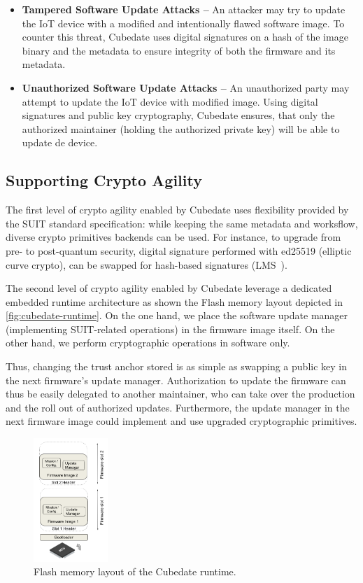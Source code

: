 \begin{itemize}
\item {\bf Tampered Software Update Attacks –} An attacker may try to update the IoT device with a modified and intentionally flawed software image. To counter this threat, Cubedate uses digital signatures on a hash of the image binary and the metadata to ensure integrity of both the firmware and its metadata.

\item {\bf Unauthorized Software Update Attacks –} An unauthorized party may attempt to update the IoT device with modified image. Using digital signatures and public key cryptography, Cubedate ensures, that only the authorized maintainer (holding the authorized private key) will be able to update de device.
\end{itemize}

\subsection{Supporting Crypto Agility}
The first level of crypto agility enabled by Cubedate uses flexibility provided by the SUIT standard specification: while keeping the same metadata and worksflow, diverse crypto primitives backends can be used. For instance, to upgrade from pre- to post-quantum security, digital signature performed with ed25519 (elliptic curve crypto), can be swapped for hash-based signatures (LMS~\cite{banegas2022quantum-suit}).

The second level of crypto agility enabled by Cubedate leverage a dedicated embedded runtime architecture as shown the Flash memory layout depicted in \autoref{fig:cubedate-runtime}. On the one hand, we place the software update manager (implementing SUIT-related operations) in the firmware image itself. On the other hand, we perform cryptographic operations in software only.

Thus, changing the trust anchor stored is as simple as swapping a public key in the next firmware's update manager.
Authorization to update the firmware can thus be easily  delegated to another maintainer, 
who can take over the production and the roll out of authorized updates.
Furthermore, the update manager in the next firmware image could
implement and use upgraded cryptographic primitives. 

\begin{figure}[t]
\begin{center}
    \includegraphics[width=0.25\textwidth]{Figures/Cubedate-slots.png}
    \caption{Flash memory layout of the Cubedate runtime.}
    \label{fig:cubedate-runtime}
\end{center}
\end{figure}

